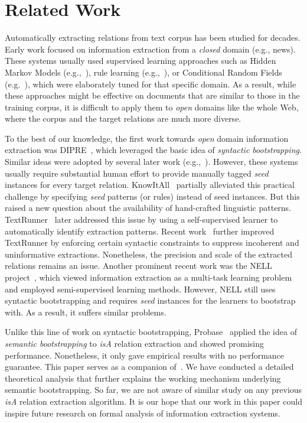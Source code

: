 \documentclass[10pt,journal,cspaper,compsoc]{IEEEtran}
\begin{document}
\section{Related Work}\label{sec:relatedwork}

Automatically extracting relations from text corpus has been studied for decades. Early work focused on information extraction from a
\emph{closed} domain (e.g., news). These systems usually used supervised learning approaches such as Hidden Markov Models (e.g.,~\cite{FreitagM00-HMM}), 
rule learning (e.g.,~\cite{Soderland99-rule}), or Conditional Random Fields (e.g.~\cite{McCallum03-CRF}), which were elaborately tuned for that specific domain. As a result, while these approaches might be effective on  documents that are similar to those in the training corpus, it is difficult to apply them to \emph{open} domains like the whole Web, where the corpus and the target relations are much more diverse.

To the best of our knowledge, the first work towards \emph{open} domain information extraction was DIPRE~\cite{brin98},
which leveraged the basic idea of \emph{syntactic bootstrapping}. Similar ideas were adopted by several later work
(e.g.,~\cite{Agichtein-snowball00,PascaLBLJ06,RiloffJ99-multi-bootstrap}).
However, these systems usually require substantial human effort to provide manually tagged \emph{seed} instances for every target
relation. KnowItAll~\cite{EtzioniCDKPSSWY04} partially alleviated this practical challenge by specifying \emph{seed} patterns
(or rules) instead of seed instances. But this raised a new question about the availability of hand-crafted linguistic patterns.
TextRunner~\cite{BankoCSBE07} later addressed this issue by using a self-supervised learner to automatically identify extraction
patterns. Recent work~\cite{FaderSE11-reverb} further improved TextRunner by enforcing certain syntactic constraints to suppress
incoherent and uninformative extractions. Nonetheless, the precision and scale of the extracted relations remains an issue.
Another prominent recent work was the NELL project~\cite{NELL}, which viewed information extraction as a multi-task learning problem
and employed semi-supervised learning methods. However, NELL still uses syntactic bootstrapping and requires \emph{seed}
instances for the learners to bootstrap with. As a result, it suffers similar problems.

Unlike this line of work on syntactic bootstrapping, Probase~\cite{WuLWZ12:Probase} applied the idea of \emph{semantic bootstrapping} to \emph{isA} relation extraction and showed promising performance.
Nonetheless, it only gave empirical results with no performance guarantee.
This paper serves as a companion of~\cite{WuLWZ12:Probase}.
We have conducted a detailed theoretical analysis that further explains the working mechanism underlying semantic bootstrapping.
So far, we are not aware of similar study on any previous \emph{isA} relation extraction algorithm.
It is our hope that our work in this paper could inspire future research on formal analysis of information extraction systems.
\end{document}
